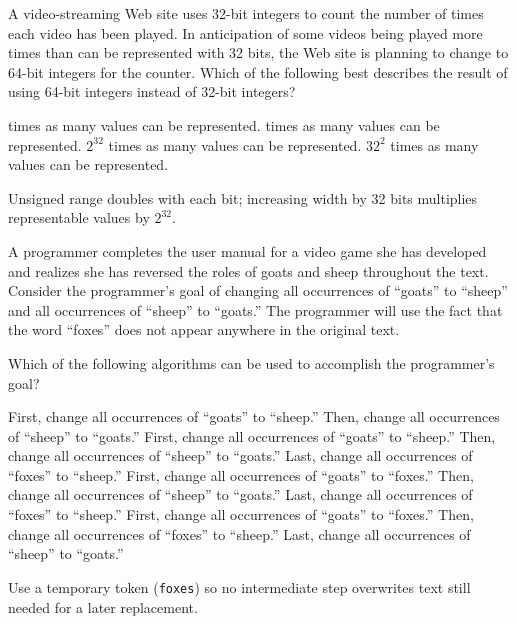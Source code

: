 


\question[5]
A video-streaming Web site uses 32-bit integers to count the number of times each video has been played. In anticipation of some videos being played more times than can be represented with 32 bits, the Web site is planning to change to 64-bit integers for the counter. Which of the following best describes the result of using 64-bit integers instead of 32-bit integers?
\begin{choices}
   times as many values can be represented. 
   times as many values can be represented.
  \CorrectChoice $2^{32}$ times as many values can be represented.
  \choice $32^{2}$ times as many values can be represented.
\end{choices}
\begin{solution}
  Unsigned range doubles with each bit; increasing width by 32 bits multiplies representable values by $2^{32}$.
\end{solution}

\question[5]
A programmer completes the user manual for a video game she has developed and realizes she has reversed the roles of goats and sheep throughout the text. Consider the programmer's goal of changing all occurrences of ``goats'' to ``sheep'' and all occurrences of ``sheep'' to ``goats.'' The programmer will use the fact that the word ``foxes'' does not appear anywhere in the original text.

Which of the following algorithms can be used to accomplish the programmer's goal?
\begin{choices}
  \choice First, change all occurrences of ``goats'' to ``sheep.'' Then, change all occurrences of ``sheep'' to ``goats.''
  \choice First, change all occurrences of ``goats'' to ``sheep.'' Then, change all occurrences of ``sheep'' to ``goats.'' Last, change all occurrences of ``foxes'' to ``sheep.''
  \CorrectChoice First, change all occurrences of ``goats'' to ``foxes.'' Then, change all occurrences of ``sheep'' to ``goats.'' Last, change all occurrences of ``foxes'' to ``sheep.''
  \choice First, change all occurrences of ``goats'' to ``foxes.'' Then, change all occurrences of ``foxes'' to ``sheep.'' Last, change all occurrences of ``sheep'' to ``goats.''
\end{choices}
\begin{solution}
  Use a temporary token (\texttt{foxes}) so no intermediate step overwrites text still needed for a later replacement.
\end{solution}

